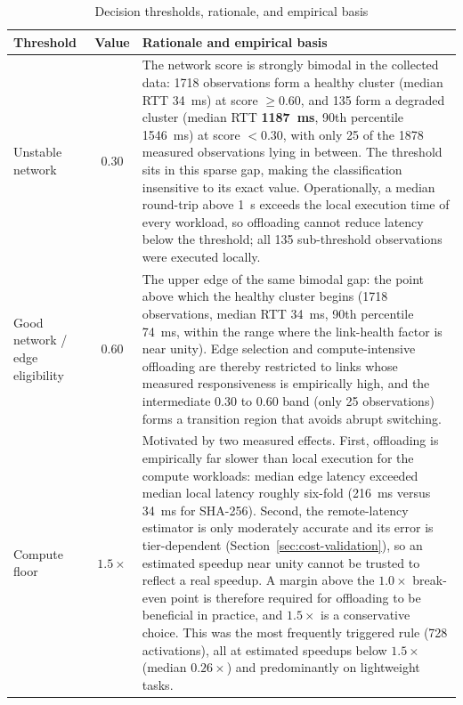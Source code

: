 \begin{table}[t]
\centering
\caption{Decision thresholds, rationale, and empirical basis}
\label{tab:thresholds}
\footnotesize
\begin{tabularx}{\columnwidth}{p{2.0cm}cX}
\toprule
Threshold & Value & Rationale and empirical basis \\
\midrule

Unstable network
& $0.30$
& The network score is strongly bimodal in the collected data: 1718 observations
form a healthy cluster (median RTT 34~ms) at score $\geq 0.60$, and 135 form a
degraded cluster (median RTT \textbf{1187~ms}, 90th percentile 1546~ms) at score
$<0.30$, with only 25 of the 1878 measured observations lying in between. The
threshold sits in this sparse gap, making the classification insensitive to its
exact value. Operationally, a median round-trip above 1~s exceeds the local
execution time of every workload, so offloading cannot reduce latency below the
threshold; all 135 sub-threshold observations were executed locally. \\

\addlinespace

Good network / edge eligibility
& $0.60$
& The upper edge of the same bimodal gap: the point above which the healthy
cluster begins (1718 observations, median RTT 34~ms, 90th percentile 74~ms,
within the range where the link-health factor is near unity). Edge selection
and compute-intensive offloading are thereby restricted to links whose measured
responsiveness is empirically high, and the intermediate 0.30 to 0.60 band
(only 25 observations) forms a transition region that avoids abrupt switching. \\

\addlinespace

Compute floor
& $1.5\times$
& Motivated by two measured effects. First, offloading is empirically far
slower than local execution for the compute workloads: median edge latency
exceeded median local latency roughly six-fold (216~ms versus 34~ms for
SHA-256). Second, the remote-latency estimator is only moderately accurate and
its error is tier-dependent (Section~\ref{sec:cost-validation}), so an estimated
speedup near unity cannot be trusted to reflect a real speedup. A margin above
the $1.0\times$ break-even point is therefore required for offloading to be
beneficial in practice, and $1.5\times$ is a conservative choice. This was the
most frequently triggered rule (728 activations), all at estimated speedups
below $1.5\times$ (median $0.26\times$) and predominantly on lightweight
tasks. \\


\end{tabularx}
\end{table}
